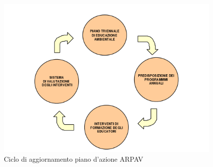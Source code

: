 \begin{figure}[htbp]
\includegraphics[scale=0.65]{./capitoli/capitolo1/img/pdca}
	\caption{Ciclo di aggiornamento piano d'azione ARPAV}
\end{figure}

